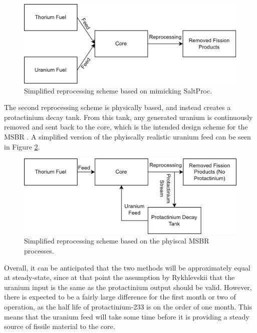 \begin{figure}[H]
  \centering
  \includegraphics[scale=0.45]{images/sp-match-repr-scheme.png}
  \caption{Simplified reprocessing scheme based on mimicking SaltProc.}
   \label{fig:spmatchrepr}
\end{figure}

The second reprocessing scheme is physically based, and instead creates a protactinium decay tank. From this tank, any generated uranium is continuously removed and sent back to the core, which is the intended design scheme for the MSBR \cite{robertson_conceptual_1971}. A simplified version of the phyiscally realistic uranium feed can be seen in Figure \ref{fig:spmatchrepr}.

\begin{figure}[H]
  \centering
  \includegraphics[scale=0.45]{images/phys-repr-scheme.png}
  \caption{Simplified reprocessing scheme based on the phyiscal MSBR processes.}
   \label{fig:spmatchrepr}
\end{figure}

Overall, it can be anticipated that the two methods will be approximately equal at steady-state, since at that point the assumption by Rykhlevskii that the uranium input is the same as the protactinium output should be valid. However, there is expected to be a fairly large difference for the first month or two of operation, as the half life of protactinium-233 is on the order of one month. This means that the uranium feed will take some time before it is providing a steady source of fissile material to the core.

